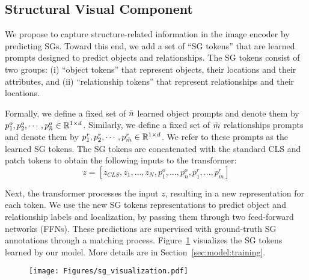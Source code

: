 \documentclass[11pt]{article}
\def\Secref#1{Section~\ref{#1}}
\newcommand{\minisection}[1]{\noindent{\textbf{#1}.}}
\newcommand{\figgref}[1]{Figure~\ref{#1}}
\def\Secref#1{Section~\ref{#1}}
\begin{document}
\subsection{Structural Visual Component}
\label{sec:model:visual}

\minisection{Scene Graphs Tokens} We propose to capture structure-related information in the image encoder by predicting SGs. Toward this end, we add a set of ``SG tokens'' that are learned prompts designed to predict objects and relationships. The SG tokens consist of two groups: (i) ``object tokens'' that represent objects, their locations and their attributes, and (ii) ``relationship tokens'' that represent relationships and their locations.

Formally, we define a fixed set of $\Tilde{n}$ learned object prompts and denote them by $p^o_1,p^o_2,\cdots,p^o_{\Tilde{n}}\in \mathbb{R}^{1\times d}$. Similarly, we define a fixed set of $\Tilde{m}$ relationships prompts and denote them by $p^r_1,p^r_2,\cdots,p^r_{\Tilde{m}}\in \mathbb{R}^{1\times d}$. We refer to these prompts as the learned SG tokens. 
The SG tokens are concatenated with the standard CLS and patch tokens to obtain the following inputs to the transformer:
\begin{equation}
    z = \left[z_{CLS},z_1,...,z_N,p^o_1,...,p^o_{\tilde{n}}, p^r_1,...,p^r_{\tilde{m}}\right]
\end{equation}

Next, the transformer processes the input $z$, resulting in a new representation for each token. We use the new SG tokens representations to predict object and relationship labels and localization, by passing them through two feed-forward networks (FFNs). These predictions are supervised with ground-truth SG annotations through a matching process. \figgref{fig:sg_visualization} visualizes the SG tokens learned by our model. More details are in \Secref{sec:model:training}. 

 \begin{figure}
\centering
    \texttt{[image: Figures/sg\_visualization.pdf]}
    \vspace{-8mm}
    \label{fig:sg_visualization}
    \vspace{-2mm}
\end{figure}
\end{document}
